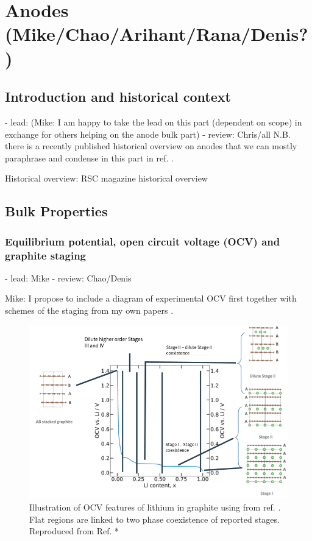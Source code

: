 \documentclass[journal=jacsat,manuscript=article]{achemso}
\begin{document}

\section{Anodes (Mike/Chao/Arihant/Rana/Denis?)}
\subsection{Introduction and historical context}
- lead: (Mike: I am happy to take the lead on this part (dependent on scope) in exchange for others helping on the anode bulk part)
- review: Chris/all
N.B. there is a recently published historical overview on anodes that we can mostly paraphrase and condense in this part in ref. .

Historical overview: RSC magazine historical overview

\subsection{Bulk Properties}
\label{sec:anode_bulk}

\subsubsection{Equilibrium potential, open circuit voltage (OCV) and graphite staging}
\label{sec:anodes_ocv}
- lead: Mike
- review: Chao/Denis

Mike: I propose to include a diagram of experimental OCV first together with schemes of the staging from my own papers \cite{Mercer2019}.

    \begin{figure}
    \centering
    \includegraphics[scale=2.3]{figures/exptocv_staging.png}
    \caption{Illustration of OCV features of lithium in graphite using from ref. . Flat regions are linked to two phase coexistence of reported stages. Reproduced from Ref. *}
    \label{fig:expt_ocv}
\end{figure}
\end{document}
